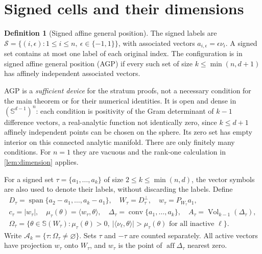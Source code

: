 \documentclass[10pt,reqno]{amsart}
\theoremstyle{definition}
\newtheorem{definition}[theorem]{Definition}
\theoremstyle{remark}
\newcommand{\Sphere}{\mathbb S}
\newcommand{\conv}{\operatorname{conv}}
\newcommand{\Vol}{\operatorname{Vol}}
\newcommand{\Span}{\operatorname{span}}
\newcommand{\aff}{\operatorname{aff}}
\newcommand{\ip}[2]{\langle #1,#2\rangle}
\begin{document}
\section{Signed cells and their dimensions}\label{sec:active}
\begin{definition}[Signed affine general position]\label{def:agp}
The signed labels are $\mathcal S=\{(i,\epsilon):1\le i\le n,\ \epsilon\in\{-1,1\}\}$, with associated vectors $a_{i,\epsilon}=\epsilon\nu_i$. A signed set contains at most one label of each original index. The configuration is in signed affine general position (AGP) if every such set of size $k\le\min(n,d+1)$ has affinely independent associated vectors.
\end{definition}
AGP is a \emph{sufficient device} for the stratum proofs, not a necessary condition for the main theorem or for their numerical identities. It is open and dense in $(\Sphere^{d-1})^n$: each condition is positivity of the Gram determinant of $k-1$ difference vectors, a real-analytic function not identically zero, since $k\le d+1$ affinely independent points can be chosen on the sphere. Its zero set has empty interior on this connected analytic manifold. There are only finitely many conditions. For $n=1$ they are vacuous and the rank-one calculation in \cref{lem:dimension} applies.

For a signed set $\tau=\{a_1,\ldots,a_k\}$ of size $2\le k\le\min(n,d)$, the vector symbols are also used to denote their labels, without discarding the labels. Define
\begin{gather}
D_\tau=\Span\{a_2-a_1,\ldots,a_k-a_1\},\quad W_\tau=D_\tau^\perp,
\quad w_\tau=P_{W_\tau}a_1,\label{eq:D-W}\\
c_\tau=|w_\tau|,\quad \mu_\tau(\theta)=\ip{w_\tau}{\theta},\quad
\Delta_\tau=\conv\{a_1,\ldots,a_k\},\quad A_\tau=\Vol_{k-1}(\Delta_\tau),\label{eq:cell-params}\\
\Omega_\tau=\{\theta\in\Sphere(W_\tau):\mu_\tau(\theta)>0,
\ |\ip{\nu_\ell}{\theta}|>\mu_\tau(\theta)\text{ for all inactive }\ell\}.
\label{eq:active-cell}
\end{gather}
Write $\mathcal A_k=\{\tau:\Omega_\tau\ne\varnothing\}$. Sets $\tau$ and $-\tau$ are counted separately. All active vectors have projection $w_\tau$ onto $W_\tau$, and $w_\tau$ is the point of $\aff\Delta_\tau$ nearest zero.
\end{document}
